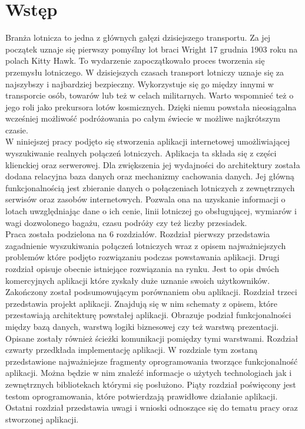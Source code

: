 \documentclass[12pt, twoside]{report}
\begin{document}
\chapter*{Wstęp}
Branża lotnicza to jedna z głównych gałęzi dzisiejszego transportu. Za jej początek uznaje się pierwszy pomyślny lot braci Wright 17 grudnia 1903 roku na polach Kitty Hawk. To wydarzenie zapoczątkowało proces tworzenia się przemysłu lotniczego. W dzisiejszych czasach transport lotniczy uznaje się za najszybszy i najbardziej bezpieczny. Wykorzystuje się go między innymi w transporcie osób, towarów lub też w celach militarnych. Warto wspomnieć też o jego roli jako prekursora lotów kosmicznych. Dzięki niemu powstała nieosiągalna wcześniej możliwość podróżowania po całym świecie w możliwe najkrótszym czasie.\\
\indent W niniejszej pracy podjęto się stworzenia aplikacji internetowej umożliwiającej wyszukiwanie realnych połączeń lotniczych. Aplikacja ta składa się z części klienckiej oraz serwerowej. Dla zwiększenia jej wydajności do architektury została dodana relacyjna baza danych oraz mechanizmy cachowania danych.
Jej główną funkcjonalnością jest zbieranie danych o połączeniach lotniczych z zewnętrznych serwisów oraz zasobów internetowych. 
 Pozwala ona na uzyskanie informacji o lotach uwzględniając dane o ich cenie, linii lotniczej go obsługującej, wymiarów i wagi dozwolonego bagażu, czasu podróży czy też liczby przesiadek.\\
\indent
Praca została podzielona na 6 rozdziałów. Rozdział pierwszy przedstawia zagadnienie wyszukiwania połączeń lotniczych wraz z opisem najważniejszych problemów które podjęto rozwiązaniu podczas powstawania aplikacji. Drugi rozdział opisuje obecnie istniejące rozwiązania na rynku. Jest to opis dwóch komercyjnych aplikacji które zyskały duże uznanie swoich użytkowników. Zakończony został podsumowującym porównaniem obu aplikacji. Rozdział trzeci przedstawia projekt aplikacji. Znajdują się w nim schematy z opisem, które przestawiają architekturę powstałej aplikacji. Obrazuje podział funkcjonalności między bazą danych, warstwą logiki biznesowej czy też warstwą prezentacji. Opisane zostały również ścieżki komunikacji pomiędzy tymi warstwami.
Rozdział czwarty przedkłada implementację aplikacji. W rozdziale tym zostaną przedstawione najważniejsze fragmenty oprogramowania tworzące funkcjonalność aplikacji. Można będzie w nim znaleźć informacje o użytych technologiach jak i zewnętrznych bibliotekach którymi się posłużono. Piąty rozdział poświęcony jest testom oprogramowania, które potwierdzają prawidłowe działanie aplikacji. Ostatni rozdział przedstawia uwagi i wnioski odnoszące się do tematu pracy oraz stworzonej aplikacji.
\end{document}
